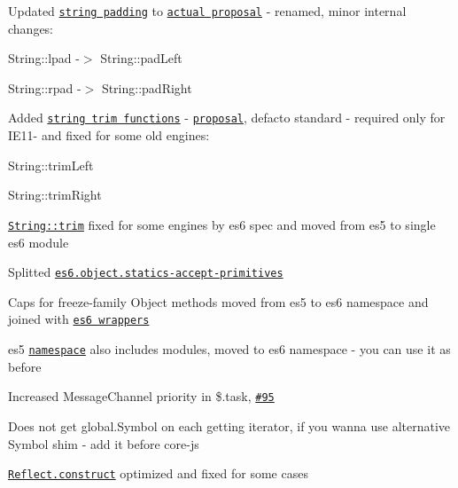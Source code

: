 \begin{DoxyItemize}
\item Updated \href{https://github.com/zloirock/core-js/#ecmascript-7-proposals}{\tt string padding} to \href{https://github.com/ljharb/proposal-string-pad-left-right}{\tt actual proposal} -\/ renamed, minor internal changes\+:
\begin{DoxyItemize}
\item {\ttfamily String\+::lpad} -\/$>$ {\ttfamily String\+::pad\+Left}
\item {\ttfamily String\+::rpad} -\/$>$ {\ttfamily String\+::pad\+Right}
\end{DoxyItemize}
\item Added \href{#ecmascript-7-proposals}{\tt string trim functions} -\/ \href{https://github.com/sebmarkbage/ecmascript-string-left-right-trim}{\tt proposal}, defacto standard -\/ required only for I\+E11-\/ and fixed for some old engines\+:
\begin{DoxyItemize}
\item {\ttfamily String\+::trim\+Left}
\item {\ttfamily String\+::trim\+Right}
\end{DoxyItemize}
\item \href{https://github.com/zloirock/core-js/#ecmascript-6-string}{\tt {\ttfamily String\+::trim}} fixed for some engines by es6 spec and moved from {\ttfamily es5} to single {\ttfamily es6} module
\item Splitted \href{https://github.com/zloirock/core-js/#ecmascript-6-object}{\tt {\ttfamily es6.\+object.\+statics-\/accept-\/primitives}}
\item Caps for {\ttfamily freeze}-\/family {\ttfamily Object} methods moved from {\ttfamily es5} to {\ttfamily es6} namespace and joined with \href{https://github.com/zloirock/core-js/#ecmascript-6-object}{\tt es6 wrappers}
\item {\ttfamily es5} \href{https://github.com/zloirock/core-js/#commonjs}{\tt namespace} also includes modules, moved to {\ttfamily es6} namespace -\/ you can use it as before
\item Increased {\ttfamily Message\+Channel} priority in {\ttfamily \$.task}, \href{https://github.com/zloirock/core-js/issues/95}{\tt \#95}
\item Does not get {\ttfamily global.\+Symbol} on each getting iterator, if you wanna use alternative {\ttfamily Symbol} shim -\/ add it before {\ttfamily core-\/js}
\item \href{https://github.com/zloirock/core-js/#ecmascript-6-reflect}{\tt {\ttfamily Reflect.\+construct}} optimized and fixed for some cases

\end{DoxyItemize}
